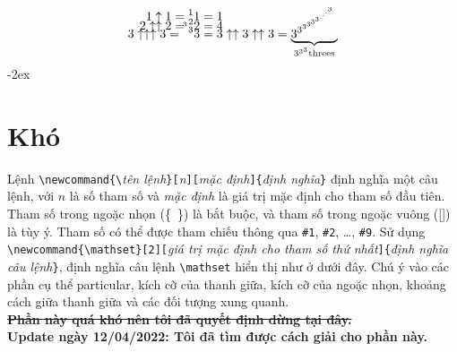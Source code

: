 \documentclass[a4paper,12pt,notitlepage]{article}
\newcommand{\mathset}[2][]{ %
	\ifthenelse{\isempty{#2}}
	{
		\emptyset
	}
	{
	\ifthenelse{\isempty{#1}}%
	{
	\left\{\!\!\!\begin{array}{c} %
		#2
	\end{array}\!\!\!\right\}
	}
	{
	\left\{\!\!\!\begin{array}{c V{1.1} c} %
		#1 & #2
	\end{array}\!\!\!\right\}
	}
	}
}
\begin{document}
	\begin{align}
		1 \uparrow 1 = {^1}1 &= 1 \nonumber \\[-2ex]
		2 \uparrow \uparrow 2 = {^2}2 &= 4 \nonumber \\[-2ex]
		3 \uparrow \uparrow \uparrow 3 = \smash{{^{^{^3}3}}3} %
		&= 3 \uparrow \uparrow 3 \uparrow \uparrow 3 = \underbrace{\smash{3^{3^{3^{3^{3^{3^{.^{.^{.^{3}}}}}}}}}}}_{3^{3^3} \text{threes}}
	\end{align}
	\newpage
	\openup -2ex
	\section{Khó}
	Lệnh \verb+\newcommand{\+\textit{tên lệnh}\verb+}[+\textit{n}\verb+][+\textit{mặc định}\verb+]{+\textit{định nghĩa}\verb+}+ định nghĩa một câu lệnh, với $n$ là
	số tham số và \textit{mặc định} là giá trị mặc định cho tham số đầu tiên.
	Tham số trong ngoặc nhọn \mbox{(\{ {} \})} là bắt buộc, và tham số trong ngoặc vuông ([\phantom{a}]) là tùy ý. 
	Tham số có thể được tham chiếu thông qua \verb|#1|, \verb|#2|, \ldots , \verb|#9|. 
	Sử dụng \verb+\newcommand{\mathset}[2][+\textit{giá trị mặc định cho tham số thứ nhất}\verb+]{+\textit{định nghĩa câu lệnh}\verb+}+, định nghĩa câu lệnh \verb+\mathset+ hiển thị như ở dưới đây. 
	Chú ý vào các phần cụ thể particular, kích cỡ của thanh giữa, kích cỡ của ngoặc nhọn, khoảng cách giữa thanh giữa và các đối tượng xung quanh. \\
	\sout{\textbf{Phần này quá khó nên tôi đã quyết định dừng tại đây.}} \\
	\textbf{Update ngày 12/04/2022: Tôi đã tìm được cách giải cho phần này.} \\
\end{document}
